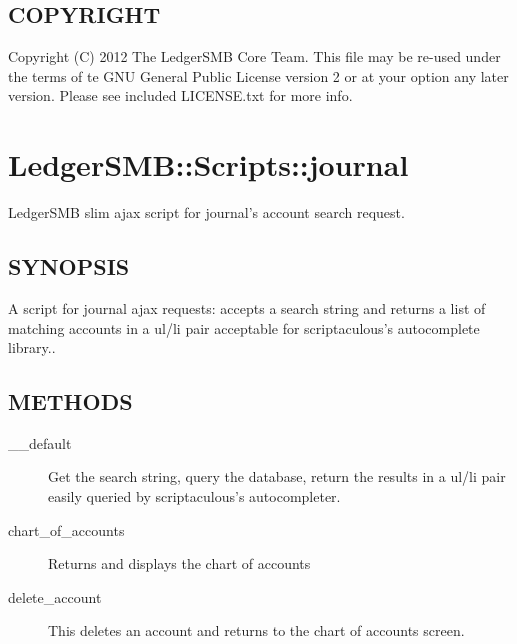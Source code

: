 \begin{description}
\begin{description}
\end{description}
\subsection*{COPYRIGHT\label{LedgerSMB::Scripts::report_aging_COPYRIGHT}}


Copyright (C) 2012 The LedgerSMB Core Team.  This file may be re-used under the
terms of te GNU General Public License version 2 or at your option any later
version.  Please see included LICENSE.txt for more info.

\section{LedgerSMB::Scripts::journal\label{LedgerSMB::Scripts::journal}}


LedgerSMB slim ajax script for journal's
account search request.

\subsection*{SYNOPSIS\label{LedgerSMB::Scripts::journal_SYNOPSIS}}


A script for journal ajax requests: accepts a search string and returns a
list of matching accounts in a ul/li pair acceptable for scriptaculous's
autocomplete library..

\subsection*{METHODS\label{LedgerSMB::Scripts::journal_METHODS}}
\begin{description}

\item[{\_\_default}] \mbox{}

Get the search string, query the database, return the results in a ul/li
pair easily queried by scriptaculous's autocompleter.


\item[{chart\_of\_accounts}] \mbox{}

Returns and displays the chart of accounts


\item[{delete\_account}] \mbox{}

This deletes an account and returns to the chart of accounts screen.




\end{description}
\end{description}

